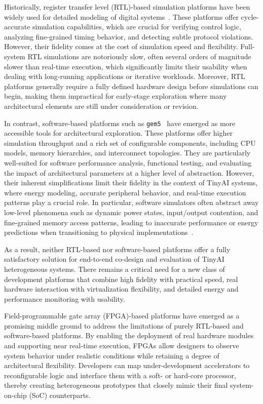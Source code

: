         Historically, register transfer level (RTL)-based simulation platforms have been widely used for detailed modeling of digital systems~\cite{pulpissimo, opentitan}. These platforms offer cycle-accurate simulation capabilities, which are crucial for verifying control logic, analyzing fine-grained timing behavior, and detecting subtle protocol violations. However, their fidelity comes at the cost of simulation speed and flexibility. Full-system RTL simulations are notoriously slow, often several orders of magnitude slower than real-time execution, which significantly limits their usability when dealing with long-running applications or iterative workloads. Moreover, RTL platforms generally require a fully defined hardware design before simulations can begin, making them impractical for early-stage exploration where many architectural elements are still under consideration or revision.

        In contrast, software-based platforms such as \texttt{gem5}~\cite{gem5} have emerged as more accessible tools for architectural exploration. These platforms offer higher simulation throughput and a rich set of configurable components, including CPU models, memory hierarchies, and interconnect topologies. They are particularly well-suited for software performance analysis, functional testing, and evaluating the impact of architectural parameters at a higher level of abstraction. However, their inherent simplifications limit their fidelity in the context of TinyAI systems, where energy modeling, accurate peripheral behavior, and real-time execution patterns play a crucial role. In particular, software simulators often abstract away low-level phenomena such as dynamic power states, input/output contention, and fine-grained memory access patterns, leading to inaccurate performance or energy predictions when transitioning to physical implementations~\cite{pathak}.
        
        As a result, neither RTL-based nor software-based platforms offer a fully satisfactory solution for end-to-end co-design and evaluation of TinyAI heterogeneous systems. There remains a critical need for a new class of development platforms that combine high fidelity with practical speed, real hardware interaction with virtualization flexibility, and detailed energy and performance monitoring with usability.

        Field-programmable gate array (FPGA)-based platforms have emerged as a promising middle ground to address the limitations of purely RTL-based and software-based platforms. By enabling the deployment of real hardware modules and supporting near real-time execution, FPGAs allow designers to observe system behavior under realistic conditions while retaining a degree of architectural flexibility. Developers can map under-development accelerators to reconfigurable logic and interface them with a soft- or hard-core processor, thereby creating heterogeneous prototypes that closely mimic their final system-on-chip (SoC) counterparts.

